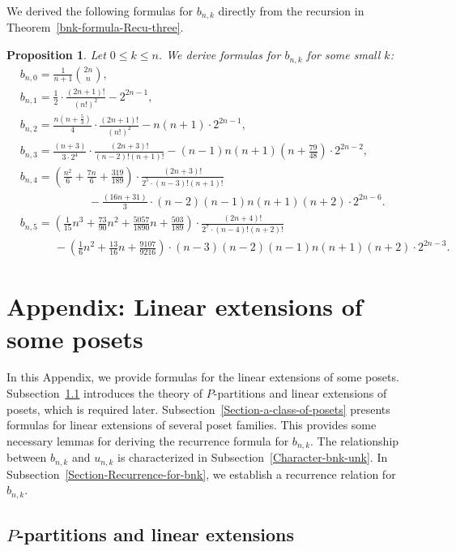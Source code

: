 \documentclass[reqno, 12pt]{article}
\newtheorem{prop}[thm]{Proposition}
\theoremstyle{mydefinition}
\theoremstyle{myremark}
\numberwithin{algorithm}{section}
\begin{document}
We derived the following  formulas for $b_{n,k}$ directly from the recursion in Theorem~\ref{bnk-formula-Recu-three}.
\begin{prop}\label{conjecture-bnk-0--5}
Let $0\leq k\leq n$.
We derive formulas for $b_{n,k}$ for some small $k$:
\begin{align*}
&b_{n,0}=\frac{1}{n+1}\binom{2n}{n},
\\& b_{n,1}=\frac{1}{2}\cdot\frac{(2n+1)!}{(n!)^2} -2^{2n-1},
\\& b_{n,2}=\frac{n(n+\frac{5}{3})}{4}\cdot \frac{(2n+1)!}{(n!)^2}-n(n+1)\cdot 2^{2n-1},
\\& b_{n,3}=\frac{(n+3)}{3\cdot 2^4}\cdot \frac{(2n+3)!}{(n-2)!(n+1)!}-(n-1)n(n+1)\left(n+\frac{79}{48}\right)\cdot 2^{2n-2},
\\& b_{n,4}=\left(\frac{n^2}{6}+\frac{7n}{6}+\frac{319}{189}\right)\cdot\frac{(2n+3)!}{2^5\cdot(n-3)!(n+1)!}
\\ & \quad\quad\quad \quad\quad\quad -\frac{(16n+31)}{3}\cdot (n-2)(n-1)n(n+1)(n+2)\cdot 2^{2n-6}.
\\& b_{n,5}=\left(\frac{1}{15} n^{3}+\frac{73}{90} n^{2}+\frac{5057}{1890} n +\frac{503}{189}\right)\cdot\frac{(2n+4)!}{2^7\cdot (n-4)!(n+2)!}
\\& \quad\quad\quad -\left(\frac{1}{6} n^{2}+\frac{13}{16} n +\frac{9107}{9216}\right)\cdot (n-3)(n-2)(n-1)n(n+1)(n+2)\cdot 2^{2n-3}.
\end{align*}
\end{prop}


\section{Appendix: Linear extensions of some posets}
\label{App:B}

In this Appendix, we provide formulas for the linear extensions of some posets.
Subsection~\ref{Section-P-partitions-linear extensions} introduces the theory of $P$-partitions and linear extensions of posets, which is required later.
Subsection~\ref{Section-a-class-of-posets} presents formulas  for linear extensions of several poset families. This provides some necessary lemmas for deriving the recurrence formula for $b_{n,k}$.
The relationship between $b_{n,k}$ and $u_{n,k}$ is characterized in Subsection~\ref{Character-bnk-unk}.
In Subsection~\ref{Section-Recurrence-for-bnk}, we establish a recurrence relation for $b_{n,k}$.


\subsection{$P$-partitions and linear extensions}\label{Section-P-partitions-linear extensions}
\end{document}
